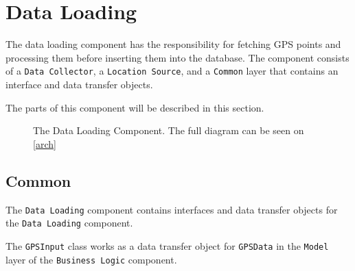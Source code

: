 \section{Data Loading}\label{arch:data_loading_component}
The data loading component has the responsibility for fetching GPS points and processing them before inserting them into the database.
The component consists of a \texttt{Data Collector}, a \texttt{Location Source}, and a \texttt{Common} layer that contains an interface and data transfer objects.

The parts of this component will be described in this section.
\begin{figure}[h]
\centering
{}
\caption{The Data Loading Component. The full diagram can be seen on \cref{arch}}
\label{dataloadingcomponent}
\end{figure}

\subsection{Common}
The \texttt{Data Loading} component contains interfaces and data transfer objects for the \texttt{Data Loading} component.

The \lstinline!GPSInput! class works as a data transfer object for \lstinline!GPSData! in the \texttt{Model} layer of the \texttt{Business Logic} component.

